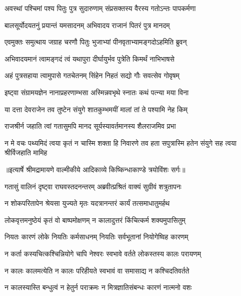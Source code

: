 \twolineshloka
{अवस्थां पश्चिमां पश्य पितुः पुत्र सुदारुणाम्}
{संप्रसक्तस्य वैरस्य गतोऽन्तः पापकर्मणा} %

\twolineshloka
{बालसूर्योदयतनुं प्रयान्तं यमसादनम्}
{अभिवादय राजानं पितरं पुत्र मानदम्} %

\twolineshloka
{एवमुक्तः समुत्थाय जग्राह चरणौ पितुः}
{भुजाभ्यां पीनवृताभ्यामङ्गदोऽहमिति ब्रुवन्} %

\twolineshloka
{अभिवादयमानं त्वामङ्गदं त्वं यथापुरा}
{दीर्घायुर्भव पुत्रेति किमर्थं नाभिभाषसे} %

\twolineshloka
{अहं पुत्रसहाया त्वामुपासे गतचेतनम्}
{सिंहेन निहतं सद्यो गौः सवत्सेव गोवृषम्} %

\twolineshloka
{इष्ट्वा संग्रामयज्ञेन नानाप्रहरणाम्भसा}
{अस्मिन्नवभृथे स्नातः कथं पत्न्या मया विना} %

\twolineshloka
{या दत्ता देवराजेन तव तुष्टेन संयुगे}
{शातकुम्भमयीं मालां तां ते पश्यामि नेह किम्} %

\twolineshloka
{राजश्रीर्न जहाति त्वां गतासुमपि मानद}
{सूर्यस्यावर्तमानस्य शैलराजमिव प्रभा} %

\fourlineindentedshloka
{न मे वचः पथ्यमिदं त्वया कृतं}
{ न चास्मि शक्ता हि निवारणे तव}
{हता सपुत्रास्मि हतेन संयुगे}
{ सह त्वया श्रीर्विजहाति मामिह} %


{॥इत्यार्षे श्रीमद्रामायणे वाल्मीकीये आदिकाव्ये किष्किन्धाकाण्डे त्रयोविंशः सर्गः॥}


\twolineshloka
{गतासुं वालिनं दृष्ट्वा राघवस्तदनन्तरम्}
{अब्रवीत्प्रश्रितं वाक्यं सुग्रीवं शत्रुतापनः} %

\twolineshloka
{न शोकपरितापेन श्रेयसा युज्यते मृतः}
{यदत्रानन्तरं कार्यं तत्समाधातुमर्हथ} %

\twolineshloka
{लोकवृत्तमनुष्ठेयं कृतं वो बाष्पमोक्षणम्}
{न कालादुत्तरं किंचित्कर्म शक्यमुपासितुम्} %

\twolineshloka
{नियतः कारणं लोके नियतिः कर्मसाधनम्}
{नियतिः सर्वभूतानां नियोगेष्विह कारणम्} %

\twolineshloka
{न कर्ता कस्यचित्कश्चिन्नियोगे चापि नेश्वरः}
{स्वभावे वर्तते लोकस्तस्य कालः परायणम्} %

\twolineshloka
{न कालः कालमत्येति न कालः परिहीयते}
{स्वभावं वा समासाद्य न कश्चिदतिवर्तते} %

\twolineshloka
{न कालस्यास्ति बन्धुत्वं न हेतुर्न पराक्रमः}
{न मित्रज्ञातिसंबन्धः कारणं नात्मनो वशः} %

